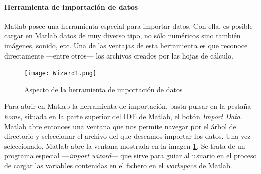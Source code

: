 \paragraph*{Herramienta de importación de datos}
Matlab posee una herramienta especial para importar datos. Con ella, es posible cargar en Matlab datos de muy diverso tipo, no sólo numéricos sino también imágenes, sonido, etc. Una de las ventajas de esta herramienta es que reconoce directamente ---entre otros--- los archivos creados por las hojas de cálculo.
\begin{figure}[h]
	\centering
		\texttt{[image: Wizard1.png]}
	\caption{Aspecto de la herramienta de importación de datos}
	\label{fig:wizard}
\end{figure}

Para abrir en Matlab la herramienta de importación, basta pulsar en la pestaña \emph{home}, situada en la parte superior del IDE de Matlab,   el botón \emph{Import Data}. Matlab abre entonces una ventana que nos permite navegar por el árbol de directorio y seleccionar el archivo del que deseamos importar los datos. Una vez seleccionado, Matlab abre la ventana mostrada en la imagen \ref{fig:wizard}. 
Se trata de un programa especial ---\emph{import wizard}--- que sirve para guiar al usuario en el proceso de cargar las variables contenidas en el fichero en el \emph{workspace} de Matlab.


\newpage
